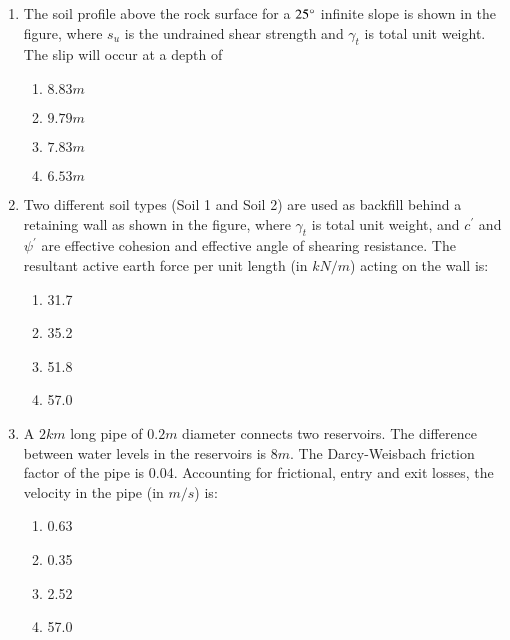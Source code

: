 \documentclass[journal]{IEEEtran}
\begin{document}
\begin{enumerate}
	\item
	The soil profile above the rock surface for a $25 \degree$ infinite slope is shown in the figure, where $s_u$ is the undrained shear strength and $\gamma_{t}$ is total unit weight. The slip will occur at a depth of
	\begin{figure}[H]
    		\centering
    		
    		\caption{}
    		\label{36}
	\end{figure}
		\begin{enumerate}
			\item $8.83 m$
			\item $9.79 m$
			\item $7.83 m$
			\item $6.53 m$
		\end{enumerate}
	\item
	Two different soil types (Soil 1 and Soil 2) are used as backfill behind a retaining wall as shown in the figure, where $\gamma_{t}$ is total unit weight, and $c^{\prime}$ and $\psi^{\prime}$ are effective cohesion and effective angle of shearing resistance. The resultant active earth force per unit length (in $kN/m$) acting on the wall is:
	\begin{figure}[H]
    		\centering
    		
    		\caption{}
    		\label{36}
	\end{figure}
		\begin{enumerate}
			\item 31.7
			\item 35.2
			\item 51.8
			\item 57.0
		\end{enumerate}
	\item
	A $2 km$ long pipe of $0.2 m$ diameter connects two reservoirs. The difference between water levels in the reservoirs is $8 m$. The Darcy-Weisbach friction factor of the pipe is 0.04. Accounting for frictional, entry and exit losses, the velocity in the pipe (in $m/s$) is:
		\begin{enumerate}
			\item 0.63
			\item 0.35
			\item 2.52
			\item 57.0
		\end{enumerate}
		
	
\end{enumerate}
\end{document}
